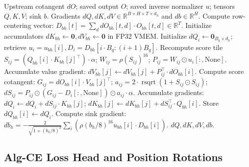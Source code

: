 \documentclass[11pt,a4paper]{article}
\theoremstyle{definition}
\newcommand{\rsqrt}{\operatorname{rsqrt}}
\begin{document}
\begin{algorithm}[H]
\caption{Pure Algebraic Attention Backward Pass (Whole-Head Resident Tiling)}
\label{alg:attn_bwd}
\begin{algorithmic}[1]
\Require Upstream cotangent $dO$; saved output $O$; saved inverse normalizer $u$; tensors $Q, K, V$; sink $b$.
\Ensure Gradients $dQ, dK, dV \in \mathbb{R}^{B \times H \times T \times d_h}$ and $db \in \mathbb{R}^H$.
    \State Compute row-centering vector: $D_{bh}[t] = \sum_{d} dO_{bh}[t, d] \cdot O_{bh}[t, d] \in \mathbb{R}^T$.
    \State Initialize accumulators $dK_{bh} \leftarrow \mathbf{0}, dV_{bh} \leftarrow \mathbf{0}$ in FP32 VMEM.
        \State Initialize $dQ_i \leftarrow \mathbf{0}_{B_q \times d_h}$; retrieve $u_i = u_{bh}[i], D_i = D_{bh}[i \cdot B_q : (i+1)B_q]$.
            \State Recompute score tile $S_{ij} = (Q_{bh}[i] \cdot K_{bh}[j]^\top) \cdot \alpha$; \quad $W_{ij} = \rho(S_{ij})^{16}$; \quad $P_{ij} = W_{ij} \odot u_i[:, \text{None}]$.
            \State Accumulate value gradient: $dV_{bh}[j] \leftarrow dV_{bh}[j] + P_{ij}^\top \cdot dO_{bh}[i]$.
            \State Compute score cotangent: $G_{ij} = dO_{bh}[i] \cdot V_{bh}[j]^\top$; \quad $a_{ij} = 2 \cdot \rsqrt(1 + S_{ij} \odot S_{ij})$;
            \State $dS_{ij} = P_{ij} \odot (G_{ij} - D_i[:, \text{None}]) \odot a_{ij} \cdot \alpha$.
            \State Accumulate gradients: $dQ_i \leftarrow dQ_i + dS_{ij} \cdot K_{bh}[j]$; \quad $dK_{bh}[j] \leftarrow dK_{bh}[j] + dS_{ij}^\top \cdot Q_{bh}[i]$.
        \EndFor
        \State Store $dQ_{bh}[i] \leftarrow dQ_i$.
    \EndFor
    \State Compute sink gradient: $db_h = - \frac{2}{\sqrt{1 + (b_h/8)^2}} \sum_i \left( \rho(b_h/8)^{16} u_{bh}[i] \cdot D_{bh}[i] \right)$.
\EndFor
\State \Return $dQ, dK, dV, db$.
\end{algorithmic}
\end{algorithm}

\subsection{Alg-CE Loss Head and Position Rotations}
\end{document}
